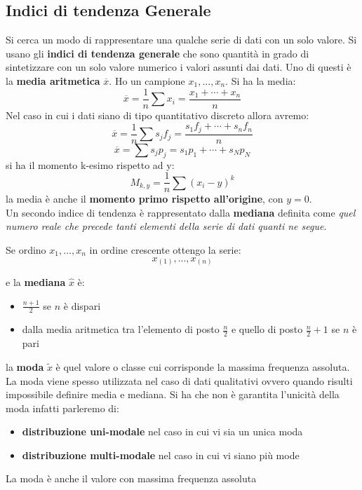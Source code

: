 \documentclass[a4paper,12pt, oneside]{book}
\begin{document}
\subsection{Indici di tendenza Generale}
Si cerca un modo di rappresentare una qualche serie di dati con un solo valore. Si usano gli \textbf{indici di tendenza generale} che sono quantità in grado di sintetizzare con un solo valore numerico i valori assunti dai dati. Uno di questi è la \textbf{media aritmetica} $\overline{x}$. Ho un campione $x_1,...,x_n$. Si ha la media:
$$\overline{x}=\frac{1}{n}\sum	x_i=\frac{x_1+\cdots+x_n}{n}$$
Nel caso in cui i dati siano di tipo quantitativo discreto allora avremo:
$$\overline{x}=\frac{1}{n}\sum	s_jf_j=\frac{s_1f_j+\cdots+s_nf_n}{n}$$
$$\overline{x}=\sum	s_jp_j=s_1p_1+\cdots+s_Np_N$$
si ha il momento k-esimo rispetto ad y:
$$M_{k,y}=\frac{1}{n}\sum{(x_i-y)^k}$$
la media è anche il \textbf{momento primo rispetto all'origine}, con $y=0$.
\\
\newpage
Un secondo indice di tendenza è rappresentato dalla \textbf{mediana} definita come \textit{quel numero reale che precede tanti elementi della serie di dati quanti ne segue}. 

Se ordino $x_1,...,x_n$ in ordine crescente ottengo la serie:
$$x_{(1)},...,x_{(n)}$$

e la \textbf{mediana} $\hat{x}$ è:
\begin{itemize}
\item $\frac{n+1}{2}$ se $n$ è dispari
\item dalla media aritmetica tra l'elemento di posto $\frac{n}{2}$ e quello di posto $\frac{n}{2}+1$ se $n$ è pari
\end{itemize}
la \textbf{moda} $\widetilde{x}$ è quel valore o classe cui corrisponde la massima frequenza assoluta. La moda viene spesso utilizzata nel caso di dati qualitativi ovvero quando risulti
impossibile definire media e mediana. Si ha che non è garantita l'unicità della moda infatti parleremo di:
\begin{itemize}
\item \textbf{distribuzione uni-modale} nel caso in cui vi sia un unica moda
\item \textbf{distribuzione multi-modale} nel caso in cui vi siano più mode
\end{itemize}
La moda è anche il valore con massima frequenza assoluta
\end{document}
